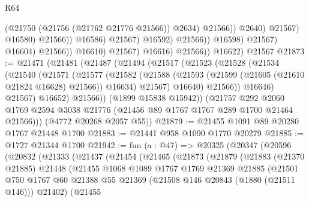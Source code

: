 \begin{lexlean}{R64}
\begin{coremodule}
                                                  (@21750 (@21756 (@21762 @21776 @21566)) @2634)
                                                  @21566))
                                              @2640)
                                            @21567)
                                          @16580)
                                        @21566))
                                    @16586)
                                  @21567)
                                @16592)
                              @21566))
                          @16598)
                        @21567)
                      @16604)
                    @21566))
                @16610)
              @21567)
            @16616)
          @21566))
      @16622)
    @21567
@21873 := @21471
    (@21481
      (@21487
        (@21494
          (@21517
            (@21523
              (@21528
                (@21534
                  (@21540
                    (@21571
                      (@21577
                        (@21582
                          (@21588
                            (@21593 (@21599 (@21605 (@21610 @21824 @16628) @21566)) @16634)
                            @21567)
                          @16640)
                        @21566))
                    @16646)
                  @21567)
                @16652)
              @21566))
          (@1899 @15838 @15942))
        (@21757
          @292
          @2060
          @1769
          @2594
          @3038
          @21776
          (@21456 @89 @1767 @1767 @289 @1700 @21464 @21566)))
      (@4772 @20268 @2057 @55))
@21879 := @21455 @1091 @89 @20280 @1767 @21448 @1700
@21883 := @21441 @958 @1090 @1770 @20279
@21885 := @1727 @21344 @1700
@21942 := fun (a : @47) =>
  @20325
    (@20347
      (@20596
        (@20832
          (@21333
            (@21437
              (@21454
                (@21465
                  (@21873
                    (@21879
                      (@21883
                        (@21370 @21885)
                        @21448
                        (@21455
                          @1068
                          @1089
                          @1767
                          @1769
                          @21369
                          @21885
                          (@21501
                            @750
                            @1767
                            @60
                            @21388
                            @55
                            @21369
                            (@21508 @146 @20843 (@1880 (@21511 @146)))
                            @21402)
                          (@21455

\end{coremodule}
\end{lexlean}
